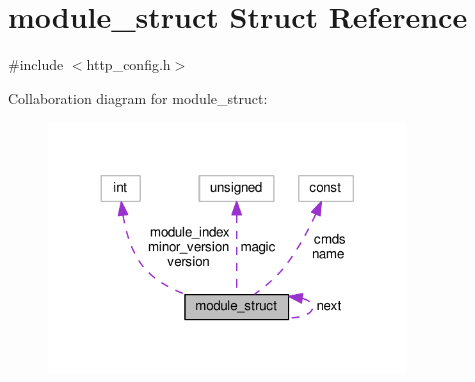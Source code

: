 \hypertarget{structmodule__struct}{}\section{module\+\_\+struct Struct Reference}
\label{structmodule__struct}


{\ttfamily \#include $<$http\+\_\+config.\+h$>$}



Collaboration diagram for module\+\_\+struct\+:
\nopagebreak
\begin{figure}[H]
\begin{center}
\leavevmode
\includegraphics[width=269pt]{structmodule__struct__coll__graph}
\end{center}
\end{figure}
